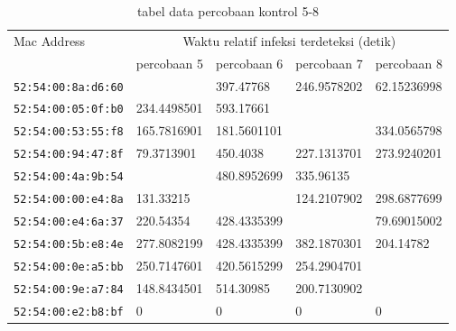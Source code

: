 \begin{table}[H]
	\caption{tabel data percobaan kontrol 5-8}
	\label{table:data percobaan kontrol 5_8}
	\centering
	\footnotesize
	\begin{tabular}{|l|l|l|l|l|}
		\hline
		\multirow{2}{*}{Mac Address} & \multicolumn{4}{c|}{Waktu relatif infeksi terdeteksi (detik)} \\ \cline{2-5} 
		& percobaan 5 & percobaan 6 & percobaan 7 & percobaan 8\\ \hline
		\footnotesize{\verb|52:54:00:8a:d6:60|} &  & 397.47768 & 246.9578202 & 62.15236998 \\ \hline
		\footnotesize{\verb|52:54:00:05:0f:b0|} & 234.4498501 & 593.17661 &  &  \\ \hline
		\footnotesize{\verb|52:54:00:53:55:f8|} & 165.7816901 & 181.5601101 &  & 334.0565798 \\ \hline
		\footnotesize{\verb|52:54:00:94:47:8f|} & 79.3713901 & 450.4038 & 227.1313701 & 273.9240201 \\ \hline
		\footnotesize{\verb|52:54:00:4a:9b:54|} &  & 480.8952699 & 335.96135 &  \\ \hline
		\footnotesize{\verb|52:54:00:00:e4:8a|} & 131.33215 &  & 124.2107902 & 298.6877699 \\ \hline
		\footnotesize{\verb|52:54:00:e4:6a:37|} & 220.54354 & 428.4335399 &  & 79.69015002 \\ \hline
		\footnotesize{\verb|52:54:00:5b:e8:4e|} & 277.8082199 & 428.4335399 & 382.1870301 & 204.14782 \\ \hline
		\footnotesize{\verb|52:54:00:0e:a5:bb|} & 250.7147601 & 420.5615299 & 254.2904701 &  \\ \hline
		\footnotesize{\verb|52:54:00:9e:a7:84|} & 148.8434501 & 514.30985 & 200.7130902 &  \\ \hline
		\footnotesize{\verb|52:54:00:e2:b8:bf|} & 0 & 0 & 0 & 0 \\ \hline
	\end{tabular}
\end{table}
